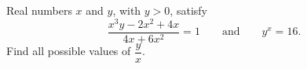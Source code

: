 Real numbers $x$ and $y$, with $y>0$, satisfy
\[
\dfrac{x^3y-2x^2+4x}{4x+6x^2}=1\qquad\text{and}\qquad y^x=16 .
\]
Find all possible values of $\dfrac{y}{x}$.
